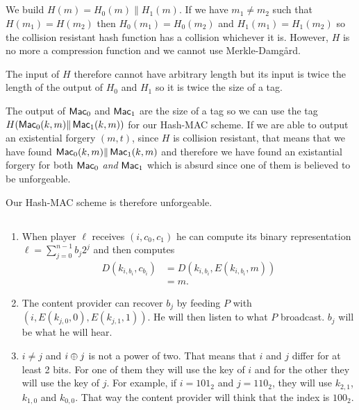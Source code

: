 \subsection{}
\begin{solution}
  We build $H(m) = H_0(m)\|H_1(m)$.
  If we have $m_1 \neq m_2$ such that $H(m_1) = H(m_2)$ then $H_0(m_1) = H_0(m_2)$ and
  $H_1(m_1) = H_1(m_2)$ so the collision resistant hash function has a collision whichever it is.
  However, $H$ is no more a compression function and we cannot use Merkle-Damg\aa{}rd.

  The input of $H$ therefore cannot have arbitrary length but its input is twice the length of the output of $H_0$ and $H_1$
  so it is twice the size of a tag.

  The output of $\operatorname{\mathsf{Mac}}_0$ and $\operatorname{\mathsf{Mac}}_1$ are the size of a tag so we can use the tag
  $H(\operatorname{\mathsf{Mac}}_0(k,m)\|\operatorname{\mathsf{Mac}}_1(k,m))$ for our Hash-MAC scheme.
  If we are able to output an existential forgery $(m, t)$,
  since $H$ is collision resistant, that means that we have found
  $\operatorname{\mathsf{Mac}}_0(k,m)\|\operatorname{\mathsf{Mac}}_1(k,m)$ and therefore we have found an existantial forgery for both
  $\operatorname{\mathsf{Mac}}_0$ \emph{and} $\operatorname{\mathsf{Mac}}_1$ which is absurd since one of them is believed to be unforgeable.

  Our Hash-MAC scheme is therefore unforgeable.
\end{solution}

\subsection{}
\begin{solution}
  \begin{enumerate}
    \item When player $\ell$ receives $(i,c_0,c_1)$ he can compute its binary representation $\ell = \sum_{j=0}^{n-1} b_j2^j$
      and then computes
      \begin{align*}
        D(k_{i,b_i}, c_{b_i})
        & = D(k_{i,b_i}, E(k_{i,b_i}, m))\\
        & = m.
      \end{align*}
    \item The content provider can recover $b_j$ by feeding $P$ with $(i,E(k_{j,0},0),E(k_{j,1},1))$.
      He will then listen to what $P$ broadcast.
      $b_j$ will be what he will hear.
    \item $i \neq j$ and $i \oplus j$ is not a power of two.
      That means that $i$ and $j$ differ for at least 2 bits.
      For one of them they will use the key of $i$ and for the other they will use the key of $j$.
      For example, if $i = 101_2$ and $j = 110_2$, they will use $k_{2,1}$, $k_{1,0}$ and $k_{0,0}$.
      That way the content provider will think that the index is $100_2$.
  \end{enumerate}
\end{solution}

